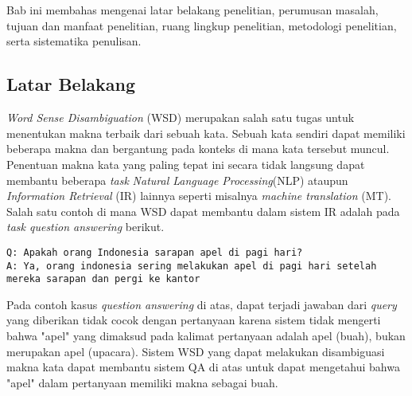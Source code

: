 \chapter{\babSatu}
Bab ini membahas mengenai latar belakang penelitian, perumusan masalah, tujuan dan manfaat penelitian, ruang lingkup penelitian, metodologi penelitian, serta sistematika penulisan.

\section{Latar Belakang}

\textit{Word Sense Disambiguation} (WSD) merupakan salah satu tugas untuk menentukan makna terbaik dari sebuah kata. Sebuah kata sendiri dapat memiliki beberapa makna dan bergantung pada konteks di mana kata tersebut muncul. Penentuan makna kata yang paling tepat ini secara tidak langsung dapat membantu beberapa \textit{task} \textit{Natural Language Processing}(NLP) ataupun \textit{Information Retrieval} (IR) lainnya seperti misalnya \textit{machine translation} (MT). Salah satu contoh  di mana WSD dapat membantu dalam sistem IR adalah pada \textit{task question answering} berikut.

\begin{lstlisting}[backgroundcolor = \color{white}]
Q: Apakah orang Indonesia sarapan apel di pagi hari?
A: Ya, orang indonesia sering melakukan apel di pagi hari setelah mereka sarapan dan pergi ke kantor 
\end{lstlisting}
Pada contoh kasus \textit{question answering} di atas, dapat terjadi jawaban dari \textit{query} yang diberikan tidak cocok dengan pertanyaan karena sistem tidak mengerti bahwa "apel" yang dimaksud pada kalimat pertanyaan adalah apel (buah), bukan merupakan apel (upacara). Sistem WSD yang dapat melakukan disambiguasi makna kata dapat membantu sistem QA di atas untuk dapat mengetahui bahwa "apel" dalam pertanyaan memiliki makna sebagai buah.

